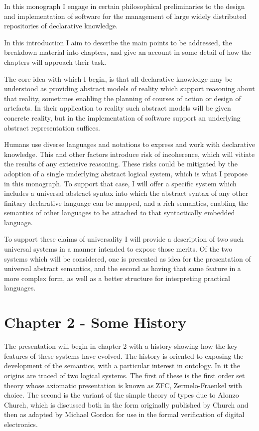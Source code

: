 In this monograph I engage in certain philosophical preliminaries to the design and implementation of software for the management of large widely distributed repositories of declarative knowledge.

In this introduction I aim to describe the main points to be addressed, the breakdown material into chapters, and give an account in some detail of how the chapters will approach their task.

The core idea with which I begin, is that all declarative knowledge may be understood as providing abstract models of reality which support reasoning about that reality, sometimes enabling the planning of courses of action or design of artefacts.
In their application to reality such abstract models will be given concrete reality, but in the implementation of software support an underlying abstract representation suffices.

Humans use diverse languages and notations to express and work with declarative knowledge.
This and other factors introduce risk of incoherence, which will vitiate the results of any extensive reasoning.
These risks could be mitigated by the adoption of a single underlying abstract logical system, which is what I propose in this monograph.
To support that case, I will offer a specific system which includes a universal abstract syntax into which the abstract syntax of any other finitary declarative language can be mapped, and a rich semantics, enabling the semantics of other languages to be attached to that syntactically embedded language.

To support these claims of universality I will provide a description of two such universal systems in a manner intended to expose those merits.
Of the two systems which will be considered, one is presented as idea for the presentation of universal abstract semantics, and the second as having that same feature in a more complex form, as well as a better structure for interpreting practical languages.

\section{Chapter 2 - Some History}

The presentation will begin in chapter 2 with a history showing how the key features of these systems have evolved.
The history is oriented to exposing the development of the semantics, with a particular interest in ontology.
In it the origins are traced of two logical systems.
The first of these is the first order set theory whose axiomatic presentation is known as ZFC, Zermelo-Fraenkel with choice.
The second is the variant of the simple theory of types due to Alonzo Church\cite{church1940}, which is discussed both in the form originally published by Church and then as adapted by Michael Gordon for use in the formal verification of digital electronics.

